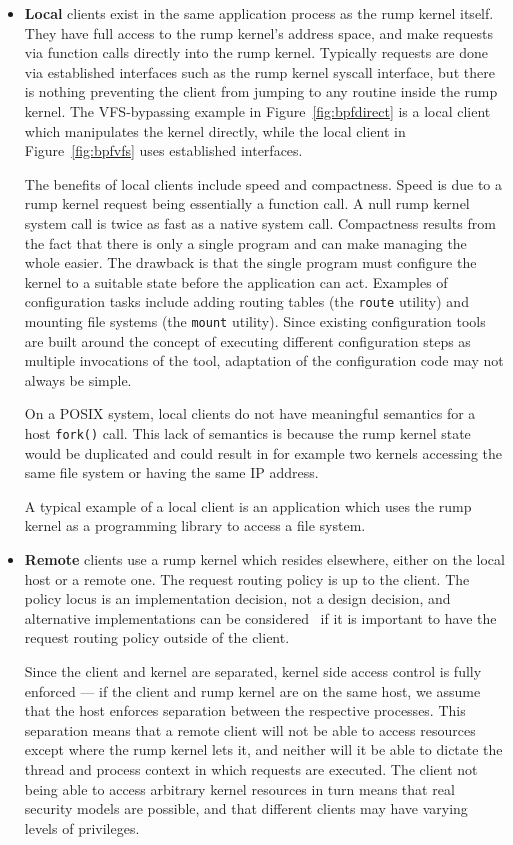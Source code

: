 \begin{itemize}
\item   \textbf{Local} clients exist in the same application process
	as the rump kernel itself.  They have full access to the
	rump kernel's address space, and make requests via function
	calls directly into the rump kernel.  Typically requests
	are done via established interfaces such as the rump kernel
	syscall interface, but there is nothing preventing the client
	from jumping to any routine inside the rump kernel.  The
	VFS-bypassing example in Figure~\ref{fig:bpfdirect} is a
	local client which manipulates the kernel directly, while
	the local client in Figure~\ref{fig:bpfvfs} uses established
	interfaces.

	The benefits of local clients include speed and compactness.
	Speed is due to a rump kernel request being essentially a
	function call.	A null rump kernel system call is twice as fast
	as a native system call.  Compactness results from the fact that
	there is only a single program and can make managing the whole
	easier.  The drawback is that the single program must configure
	the kernel to a suitable state before the application can act.
	Examples of configuration tasks include adding routing tables
	(the \texttt{route} utility) and mounting file systems (the
	\texttt{mount} utility).  Since existing configuration tools are
	built around the concept of executing different configuration
	steps as multiple invocations of the tool, adaptation of the
	configuration code may not always be simple.

	On a POSIX system, local clients do not have meaningful semantics
	for a host \texttt{fork()} call.  This lack of semantics is
	because the rump kernel state would be duplicated and could
	result in for example two kernels accessing the same file system
	or having the same IP address.

	A typical example of a local client is an application which
	uses the rump kernel as a programming library \eg to access
	a file system.

\item	\textbf{Remote} clients use a rump kernel which resides
	elsewhere, either on the local host or a remote one.  The request
	routing policy is up to the client.  The policy locus is an
	implementation decision, not a design decision, and alternative
	implementations can be considered~\cite{gardenghi:viewos} if
	it is important to have the request routing policy outside of
	the client.

	Since the client and kernel are separated, kernel side
	access control is fully enforced --- if the client and rump
	kernel are on the same host, we assume that the host enforces
	separation between the respective processes.  This separation
	means that a remote client will not be able to access resources
	except where the rump kernel lets it, and neither will it be able
	to dictate the thread and process context in which requests are
	executed.  The client not being able to access arbitrary kernel
	resources in turn means that real security models are possible,
	and that different clients may have varying levels of privileges.


\end{itemize}
